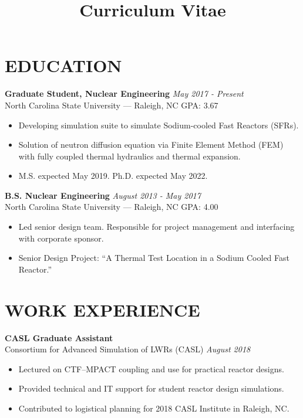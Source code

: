 \documentclass[letterpaper,10pt,nocolor,final]{moderncv}
\title{Curriculum Vitae}
\begin{document}
\maketitle


\section{EDUCATION}  
\textbf{Graduate Student, Nuclear Engineering} \hfill 
  \textit{May 2017 - Present}\\
North Carolina State University --- Raleigh, NC \hfill GPA: 3.67
\begin{itemize}
    \item Developing simulation suite to simulate Sodium-cooled Fast Reactors 
      (SFRs).
    \item Solution of neutron diffusion equation via Finite Element Method (FEM)
      with fully coupled thermal hydraulics and thermal expansion.
    \item M.S. expected May 2019. Ph.D. expected May 2022.
\end{itemize}

\textbf{B.S. Nuclear Engineering} \hfill \textit{August 2013 - May 2017} \\
North Carolina State University --- Raleigh, NC \hfill GPA: 4.00
\begin{itemize}
    \item Led senior design team. Responsible for project management and 
      interfacing with corporate sponsor.
    \item Senior Design Project: ``A Thermal Test Location in a Sodium Cooled
      Fast Reactor.''
\end{itemize}

 
\section{WORK  EXPERIENCE}

\textbf{CASL Graduate Assistant}\\
Consortium for Advanced Simulation of LWRs (CASL) \hfill \textit{August 2018}
\begin{itemize}
    \item Lectured on CTF--MPACT coupling and use for practical reactor designs.
    \item Provided technical and IT support for student reactor design 
      simulations.
    \item Contributed to logistical planning for 2018 CASL Institute in Raleigh,
      NC.
\end{itemize}
\end{document}
